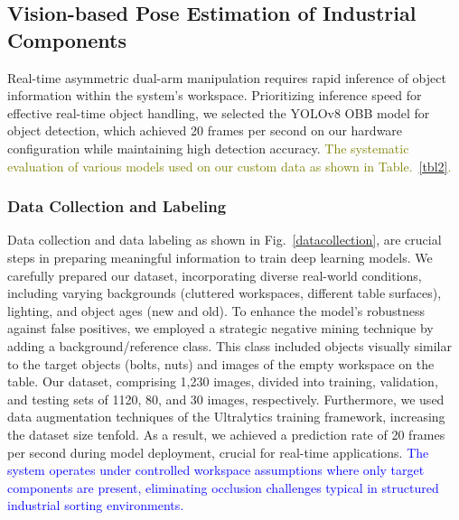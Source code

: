 \documentclass[utf8]{FrontiersinHarvard}
\begin{document}
\subsection{Vision-based Pose Estimation of Industrial Components}
\label{deep_learning}
Real-time asymmetric dual-arm manipulation requires rapid inference of object information within the system's workspace. Prioritizing inference speed for effective real-time object handling, we selected the YOLOv8 OBB model for object detection, which achieved 20 frames per second on our hardware configuration while maintaining high detection accuracy. \textcolor{olive}{The systematic evaluation of various models used on our custom data as shown in Table.~\ref{tbl2}.}
\subsubsection{Data Collection and Labeling}
Data collection and data labeling as shown in Fig.~\ref{datacollection}, are crucial steps in preparing meaningful information to train deep learning models. We carefully prepared our dataset, incorporating diverse real-world conditions, including varying backgrounds (cluttered workspaces, different table surfaces), lighting, and object ages (new and old). To enhance the model's robustness against false positives, we employed a strategic negative mining technique by adding a background/reference class. This class included objects visually similar to the target objects (bolts, nuts) and images of the empty workspace on the table. Our dataset, comprising 1,230 images, divided into training, validation, and testing sets of 1120, 80, and 30 images, respectively. Furthermore, we used data augmentation techniques of the Ultralytics training framework, increasing the dataset size tenfold. As a result, we achieved a prediction rate of 20 frames per second during model deployment, crucial for real-time applications. \textcolor{blue}{The system operates under controlled workspace assumptions where only target components are present, eliminating occlusion challenges typical in structured industrial sorting environments.}
\end{document}

